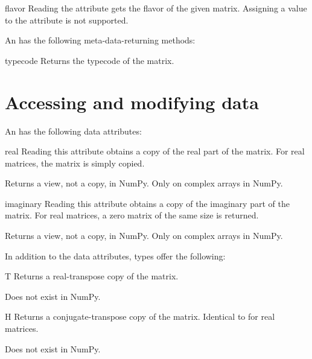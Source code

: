 \begin{memberdesc}[Array]{flavor}
  Reading the  attribute gets the flavor of the given
  matrix. Assigning a value to the  attribute is not supported.
\end{memberdesc}

An  has the following meta-data-returning methods:

\begin{methoddesc}[Array]{typecode}{}
  Returns the typecode of the matrix.
\end{methoddesc}

\section{Accessing and modifying  data}

An  has the following data attributes:

\begin{memberdesc}[Array]{real}
  Reading this attribute obtains a copy of the real part of the matrix.
  For real matrices, the matrix is simply copied.

  Returns a view, not a copy, in NumPy. Only on complex arrays in NumPy.
\end{memberdesc}

\begin{memberdesc}[Array]{imaginary}
  Reading this attribute obtains a copy of the imaginary part of the matrix.
  For real matrices, a zero matrix of the same size is returned.

  Returns a view, not a copy, in NumPy. Only on complex arrays in NumPy.
\end{memberdesc}

In addition to the  data attributes,  types
offer the following:

\begin{memberdesc}[Matrix]{T}
  Returns a real-transpose copy of the matrix.

  Does not exist in NumPy.
\end{memberdesc}

\begin{memberdesc}[Matrix]{H}
  Returns a conjugate-transpose copy of the matrix.
  Identical to  for real matrices.

  Does not exist in NumPy.
\end{memberdesc}

